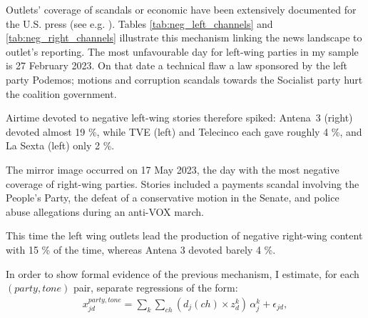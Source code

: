 \documentclass[12pt]{article}
\begin{document}

Outlets' coverage of scandals or economic  have been extensively documented for the U.S. press  (see e.g. \cite{puglisi2011newspapers, Larcinese2007NBERWP}). Tables \ref{tab:neg_left_channels} and \ref{tab:neg_right_channels} illustrate this mechanism linking the news landscape to outlet's reporting. 
The most unfavourable day for left-wing parties in my sample is 27 February 2023.  
On that date a technical flaw a law sponsored by the left party Podemos; motions and corruption scandals towards the Socialist party hurt the coalition government. 

Airtime devoted to negative left-wing stories therefore spiked: Antena~3 (right) devoted almost 19 \%, while TVE (left) and Telecinco each gave roughly 4 \%, and La Sexta (left) only 2 \%.

The mirror image occurred on 17 May 2023, the day with the most negative coverage of right-wing parties.  
Stories included a payments scandal involving the People's Party, the defeat of a conservative motion in the Senate, and police abuse allegations during an anti-VOX march.  

This time the left wing outlets lead the production of negative right-wing content with 15 \% of the time, whereas Antena 3 devoted barely 4 \%. 


\medskip

In order to show formal evidence of the previous mechanism,  I estimate, for each $(party,tone)$ pair, separate regressions of the form:
\begin{equation}\label{eq:pred_pos}
	\begin{aligned}
		 x^{party, tone}_{jd} =	\sum_{k} \sum_{ch}
		\left(d_j(ch) \times z^{k}_d\right)\,\alpha_{j}^{k}
		+ \epsilon_{jd},
	\end{aligned}
\end{equation}
\end{document}

